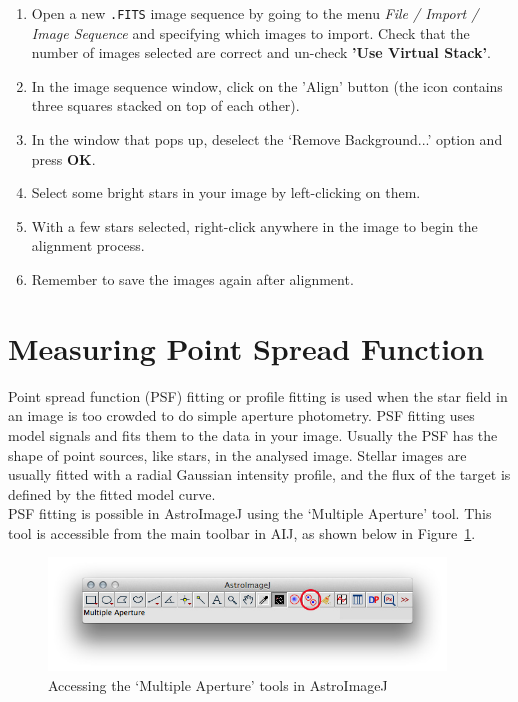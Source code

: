 \documentclass[12pt,twoside,a4paper]{report}
\begin{document}
\begin{enumerate}
 \item Open a new {\tt .FITS} image sequence by going to the menu \emph{File / Import / Image Sequence} and specifying which images to import. Check that the number of images selected are correct and un-check \textbf{'Use Virtual Stack'}.
 \item In the image sequence window, click on the 'Align' button (the icon contains three squares stacked on top of each other).
 \item In the window that pops up, deselect the `Remove Background...' option and press \textbf{OK}.
 \item Select some bright stars in your image by left-clicking on them.
 \item With a few stars selected, right-click anywhere in the image to begin the alignment process.
 \item Remember to save the images again after alignment.
\end{enumerate}


\section{Measuring Point Spread Function}
\label{PSF}

Point spread function (PSF) fitting or profile fitting is used when the star field in an image is too crowded to do simple aperture photometry. PSF fitting uses model signals and fits them to the data in your image. Usually the PSF has the shape of point sources, like stars, in the analysed image. Stellar images are usually fitted with a radial Gaussian intensity profile, and the flux of the target is defined by the fitted model curve.\\

PSF fitting is possible in AstroImageJ using the `Multiple Aperture' tool. This tool is accessible from the main toolbar in AIJ, as shown below in Figure~\ref{fig:AIJ_MA}.

\begin{figure}[ht]
  \centering
    \includegraphics[width=0.94\textwidth]{documentation_images/AIJtoolbarMA.jpg}
    \caption{\label{fig:AIJ_MA}Accessing the `Multiple Aperture' tools in AstroImageJ}
 \end{figure}
\end{document}
